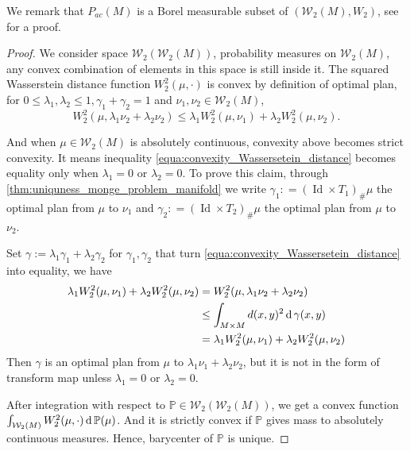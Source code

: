 We remark that $P_{ac}(M)$ is a Borel measurable subset of $(\mathcal{W}_2(M), W_2)$,
see \cite[Proposition 2.1]{KIM2017640} for a proof.

\begin{proof}
	We consider space $\mathcal{W}_2(\mathcal{W}_2(M))$, probability measures on $\mathcal{W}_2(M)$,
	any convex combination of elements in this space is still inside it.
	The squared Wasserstein distance function $W^2_2(\mu, \cdot)$ is convex by definition of optimal plan,
	for $0 \leq \lambda_1, \lambda_2 \leq 1, \gamma_1 + \gamma_2 =1 $ and $ \nu_1,\nu_2 \in \mathcal{W}_2(M)$,
	\begin{equation}
		\label{equa:convexity_Wassersetein_distance}
		W_2^2(\mu, \lambda_1 \nu_2 + \lambda_2 \nu_2) \leq \lambda_1 W_2^2(\mu, \nu_1) + \lambda_2 W_2^2(\mu, \nu_2).
	\end{equation}

	And when $\mu \in \mathcal{W}_2(M)$ is absolutely continuous, convexity above becomes strict convexity.
	It means inequality \cref{equa:convexity_Wassersetein_distance} becomes equality only when
	$\lambda_1=0$ or $\lambda_2=0$.
	To prove this claim,
	through \cref{thm:uniquness_monge_problem_manifold} we write
	$\gamma_1 : = (\operatorname{Id}  \times T_1)_{\#}\mu$ the optimal plan from $\mu$ to $\nu_1$ and
	$\gamma_2 : = (\operatorname{Id}  \times T_2)_{\#}\mu$ the optimal plan from $\mu$ to $\nu_2$.

	Set $\gamma := \lambda_1 \gamma_1 + \lambda_2 \gamma_2$ for $\gamma_1, \gamma_2$ that turn
	\cref{equa:convexity_Wassersetein_distance} into equality,
	we have
	\begin{align*}
		\lambda_1 W_2^2(\mu, \nu_1) + \lambda_2 W_2^2(\mu, \nu_2) & = W_2^2(\mu, \lambda_1 \nu_2 + \lambda_2 \nu_2)            \\
		                                                          & \leq \int_{M \times M} d(x,y)^2 \operatorname{d} \gamma(x,y)          \\
		                                                          & =	\lambda_1 W_2^2(\mu, \nu_1) + \lambda_2 W_2^2(\mu, \nu_2)
	\end{align*}
	Then $\gamma$ is an optimal plan from $ \mu$ to $\lambda_1 \nu_1 + \lambda_2 \nu_2$,
	but it is not in the form of transform map unless $\lambda_1 =0$ or $\lambda_2 =0$.

	After integration with respect to $\mathbb{P} \in \mathcal{W}_2(\mathcal{W}_2(M))$,
	we get a convex function $\int_{\mathcal{W}_2(M)} W_2^2(\mu, \cdot) \operatorname{d} \mathbb{P}(\mu)$.
	And it is strictly convex if $\mathbb{P}$ gives mass to absolutely continuous measures.
	Hence, barycenter of $\mathbb{P}$ is unique.
\end{proof}

